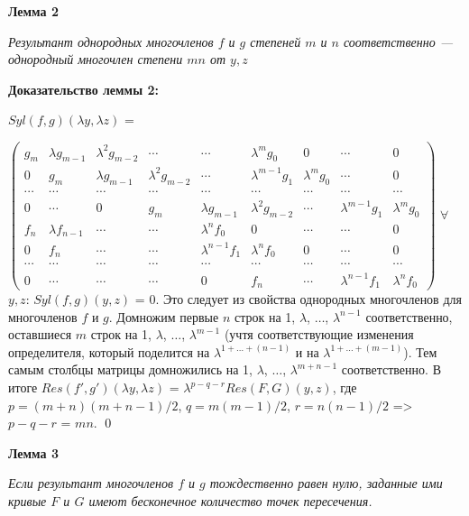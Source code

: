 \documentclass[a4paper, 12pt]{article}
\begin{document}
\smallskip
\textbf{Лемма 2}

\textit{Результант однородных многочленов $f$ и $g$ степеней $m$ и $n$ соответственно --- однородный многочлен степени $mn$ от $y,z$}

\textbf{Доказательство леммы 2:}\newline

$Syl(f,g)(\lambda y,\lambda z)$ =

$\begin{pmatrix}
g_m & \lambda g_{m-1} & \lambda^{2} g_{m-2} & \cdots & \cdots & \lambda^{m}g_0 & 0 & \cdots & 0 \\
0 & g_m & \lambda g_{m-1} & \lambda^{2} g_{m-2} & \cdots & \lambda^{m-1} g_1 & \lambda^{m} g_0 & \cdots & 0 \\
\cdots & \cdots & \cdots & \cdots & \cdots & \cdots & \cdots & \cdots & \cdots \\
0 & \cdots & 0 & g_m & \lambda g_{m-1} & \lambda^{2} g_{m-2} & \cdots & \lambda^{m-1} g_1 & \lambda^{m} g_0 \\
f_n & \lambda f_{n-1} & \cdots & \cdots & \lambda^{n} f_0 & 0 & \cdots & \cdots & 0 \\
0 & f_n & \cdots & \cdots & \lambda^{n-1} f_1 & \lambda^{n} f_0 & 0 & \cdots & 0 \\
\cdots & \cdots & \cdots & \cdots & \cdots & \cdots & \cdots & \cdots & \cdots \\
0 & \cdots & \cdots & \cdots & 0 & f_n & \cdots & \lambda^{n-1} f_1 & \lambda^{n} f_0
\end{pmatrix}$\newline
$\forall$ $y,z$: $Syl(f,g)(y,z)$ = $0$. Это следует из свойства однородных многочленов для многочленов $f$ и $g$.
\newline
Домножим первые $n$ строк на 1, $\lambda$, $\dots$, $\lambda^{n-1}$ соответственно, оставшиеся $m$ строк на 1, $\lambda$, $\dots$, $\lambda^{m-1}$ (учтя соответствующие изменения определителя, который поделится на $\lambda^{1 +\dots + (n-1)}$ и на $\lambda^{1 +\dots + (m-1)}$).
Тем самым столбцы матрицы домножились на 1, $\lambda$, $\dots$, $\lambda^{m + n - 1}$ соответственно.\newline
В итоге $Res(f',g')(\lambda y,\lambda z)$ = $\lambda^{p-q-r}Res(F,G)(y,z)$, где $p = (m+n)(m+n-1)/2$, $q = m(m-1)/2 $, $r = n(n-1)/2$ => $p-q-r$ = $mn$.
\qed

\smallskip
\textbf{Лемма 3}

\textit{Если результант многочленов $f$ и $g$ тождественно равен нулю, заданные ими кривые $F$ и $G$ имеют бесконечное количество точек пересечения.}
\end{document}
